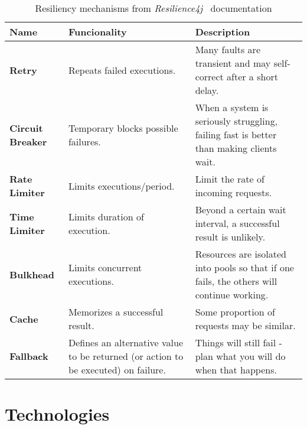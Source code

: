 \begin{table}[h!]
    \centering
    \caption{Resiliency mechanisms from \textit{Resilience4j}~\cite{resilience4j} documentation}
    \label{tab:resilience-patterns}
    \vspace{0.3cm}
    \begin{tabular}{|l|p{6cm}|p{6cm}|}
        \hline
        \textbf{Name}            & \textbf{Funcionality}                                                              & \textbf{Description}                                                                      \\ \hline
        \textbf{Retry}           & Repeats failed executions.                                                         & Many faults are transient and may self-correct after a short delay.                       \\ \hline
        \textbf{Circuit Breaker} & Temporary blocks possible failures.                                                & When a system is seriously struggling, failing fast is better than making clients wait.   \\ \hline
        \textbf{Rate Limiter}    & Limits executions/period.                                                          & Limit the rate of incoming requests.                                                      \\ \hline
        \textbf{Time Limiter}    & Limits duration of execution.                                                      & Beyond a certain wait interval, a successful result is unlikely.                          \\ \hline
        \textbf{Bulkhead}        & Limits concurrent executions.                                                      & Resources are isolated into pools so that if one fails, the others will continue working. \\ \hline
        \textbf{Cache}           & Memorizes a successful result.                                                     & Some proportion of requests may be similar.                                               \\ \hline
        \textbf{Fallback}        & Defines an alternative value to be returned (or action to be executed) on failure. & Things will still fail - plan what you will do when that happens. \\ \hline
    \end{tabular}
\end{table}

\section{Technologies}\label{sec:technologies}

